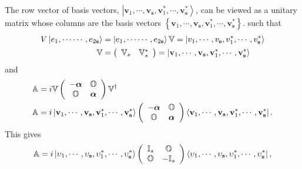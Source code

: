 \documentclass[aps,preprint]{revtex4}%
\begin{document}
The row vector of basis vectors, $\left\vert \mathbf{v}_{1},\cdots
,\mathbf{v}_{\mathbf{s}},\mathbf{v}_{1}^{\ast},\cdots,\mathbf{v}_{\mathbf{s}%
}^{\ast}\right\rangle $, can be viewed as a unitary matrix whose columns are
the basis vectors $\left\{  \mathbf{v}_{1},\cdots,\mathbf{v}_{\mathbf{s}%
},\mathbf{v}_{1}^{\ast},\cdots,\mathbf{v}_{\mathbf{s}}^{\ast}\right\}  $. such
that
\begin{align}
V\left\vert e_{1},\cdots\cdots,e_{2\mathbf{s}}\right\rangle  &  =\left\vert
e_{1},\cdots\cdots,e_{2\mathbf{s}}\right\rangle \mathbb{V}=\left\vert
v_{1},\cdots,v_{\mathbf{s}},v_{1}^{\ast},\cdots,v_{\mathbf{s}}^{\ast
}\right\rangle \\
\mathbb{V}  &  =\left(
\begin{array}
[c]{cc}%
\mathbb{V}_{s} & \mathbb{V}_{s}^{\ast}%
\end{array}
\right)  =\left\vert \mathbf{v}_{1},\cdots,\mathbf{v}_{\mathbf{s}}%
,\mathbf{v}_{1}^{\ast},\cdots,\mathbf{v}_{\mathbf{s}}^{\ast}\right\rangle
\end{align}
and
\begin{align}
\mathbb{A}  &  =i\mathbb{V}\left(
\begin{array}
[c]{cc}%
-\boldsymbol{\alpha} & \mathbb{O}\\
\mathbb{O} & \boldsymbol{\alpha}%
\end{array}
\right)  \mathbb{V}^{\dagger}\\
\mathbb{A}  &  =i\left\vert \mathbf{v}_{1},\cdots,\mathbf{v}_{\mathbf{s}%
},\mathbf{v}_{1}^{\ast},\cdots,\mathbf{v}_{\mathbf{s}}^{\ast}\right\rangle
\left(
\begin{array}
[c]{cc}%
-\boldsymbol{\alpha} & \mathbb{O}\\
\mathbb{O} & \boldsymbol{\alpha}%
\end{array}
\right)  \left\langle \mathbf{v}_{1},\cdots,\mathbf{v}_{\mathbf{s}}%
,\mathbf{v}_{1}^{\ast},\cdots,\mathbf{v}_{\mathbf{s}}^{\ast}\right\vert .
\end{align}
This gives
\begin{equation}
\mathbb{A}=i\left\vert \mathbf{\upsilon}_{1},\cdots,\mathbf{\upsilon
}_{\mathbf{s}},\mathbf{\upsilon}_{1}^{\ast},\cdots,\mathbf{\upsilon
}_{\mathbf{s}}^{\ast}\right\rangle \left(
\begin{array}
[c]{cc}%
\mathbb{I}_{s} & \mathbb{O}\\
\mathbb{O} & -\mathbb{I}_{s}%
\end{array}
\right)  \left\langle \mathbf{\upsilon}_{1},\cdots,\mathbf{\upsilon
}_{\mathbf{s}},\mathbf{\upsilon}_{1}^{\ast},\cdots,\mathbf{\upsilon
}_{\mathbf{s}}^{\ast}\right\vert ,
\end{equation}
\end{document}
